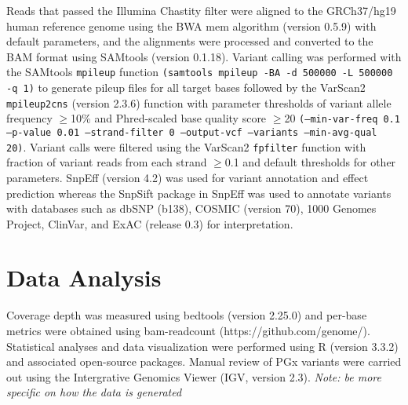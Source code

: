 Reads that passed the Illumina Chastity filter were aligned to the GRCh37/hg19 human reference genome using the BWA mem algorithm (version 0.5.9) with default parameters, and the alignments were processed and converted to the BAM format using SAMtools (version 0.1.18). Variant calling was performed with the SAMtools \texttt{mpileup} function \texttt{(samtools mpileup -BA -d 500000 -L 500000 -q 1)} to generate pileup files for all target bases followed by the VarScan2 \texttt{mpileup2cns} (version 2.3.6) function with parameter thresholds of variant allele frequency $\geq$10\% and Phred-scaled base quality score $\geq$20 \texttt{(--min-var-freq 0.1 --p-value 0.01 --strand-filter 0 --output-vcf --variants --min-avg-qual 20)}. Variant calls were filtered using the VarScan2 \texttt{fpfilter} function with fraction of variant reads from each strand $\geq$0.1 and default thresholds for other parameters. SnpEff (version 4.2) was used for variant annotation and effect prediction whereas the SnpSift package in SnpEff was used to annotate variants with databases such as dbSNP (b138), COSMIC (version 70), 1000 Genomes Project, ClinVar, and ExAC (release 0.3) for interpretation.

\section{Data Analysis}
\label{sec:DataAnalysis}

Coverage depth was measured using bedtools (version 2.25.0) and per-base metrics were obtained using bam-readcount (https://github.com/genome/). Statistical analyses and data visualization were performed using R (version 3.3.2) and associated open-source packages. Manual review of PGx variants were carried out using the Intergrative Genomics Viewer (IGV, version 2.3). \textit{Note: be more specific on how the data is generated}

\endinput

